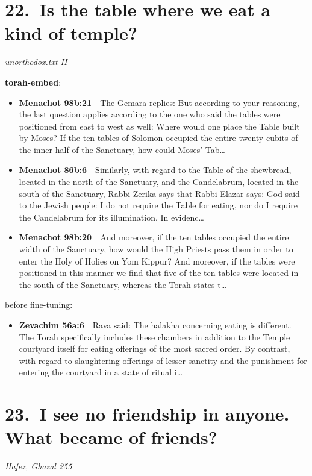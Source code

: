 \documentclass[11pt,a4paper]{article}
\begin{document}
\section*{22.\ Is the table where we eat a kind of temple?}
{\color{quiet}\small\textit{unorthodox.txt II}}

{\color{quiet}\small\textbf{torah-embed}:}
\begin{itemize}[leftmargin=1.2em,itemsep=3pt]
\item {\color{ref}\textbf{Menachot 98b:21}}\ \ The Gemara replies: But according to your reasoning, the last question applies according to the one who said the tables were positioned from east to west as well: Where would one place the Table built by Moses? If the ten tables of Solomon occupied the entire twenty cubits of the inner half of the Sanctuary, how could Moses’ Tab\ldots
\item {\color{ref}\textbf{Menachot 86b:6}}\ \ Similarly, with regard to the Table of the shewbread, located in the north of the Sanctuary, and the Candelabrum, located in the south of the Sanctuary, Rabbi Zerika says that Rabbi Elazar says: God said to the Jewish people: I do not require the Table for eating, nor do I require the Candelabrum for its illumination. In evidenc\ldots
\item {\color{ref}\textbf{Menachot 98b:20}}\ \ And moreover, if the ten tables occupied the entire width of the Sanctuary, how would the High Priests pass them in order to enter the Holy of Holies on Yom Kippur? And moreover, if the tables were positioned in this manner we find that five of the ten tables were located in the south of the Sanctuary, whereas the Torah states t\ldots
\end{itemize}
{\color{quiet}\small before fine-tuning:}
\begin{itemize}[leftmargin=1.2em]
\item {\color{ref}\textbf{Zevachim 56a:6}}\ \ Rava said: The halakha concerning eating is different. The Torah specifically includes these chambers in addition to the Temple courtyard itself for eating offerings of the most sacred order. By contrast, with regard to slaughtering offerings of lesser sanctity and the punishment for entering the courtyard in a state of ritual i\ldots
\end{itemize}

\section*{23.\ I see no friendship in anyone. What became of friends?}
{\color{quiet}\small\textit{Hafez, Ghazal 255}}
\end{document}
